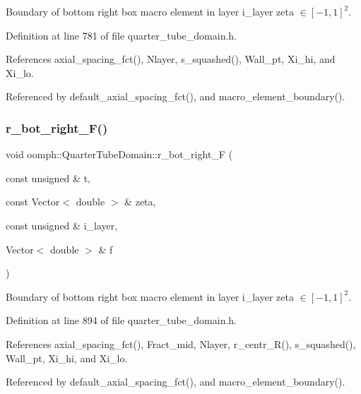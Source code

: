 Boundary of bottom right box macro element in layer i\+\_\+layer zeta $ \in [-1,1]^2 $. 



Definition at line 781 of file quarter\+\_\+tube\+\_\+domain.\+h.



References axial\+\_\+spacing\+\_\+fct(), Nlayer, s\+\_\+squashed(), Wall\+\_\+pt, Xi\+\_\+hi, and Xi\+\_\+lo.



Referenced by default\+\_\+axial\+\_\+spacing\+\_\+fct(), and macro\+\_\+element\+\_\+boundary().

\mbox{\label{classoomph_1_1QuarterTubeDomain_a7d71f1ff7b0ea3a9bdbf68b6248a60fe}} 
\subsubsection{\texorpdfstring{r\+\_\+bot\+\_\+right\+\_\+\+F()}{r\_bot\_right\_F()}}
{\footnotesize\ttfamily void oomph\+::\+Quarter\+Tube\+Domain\+::r\+\_\+bot\+\_\+right\+\_\+F (\begin{DoxyParamCaption}\item[{const unsigned \&}]{t,  }\item[{const Vector$<$ double $>$ \&}]{zeta,  }\item[{const unsigned \&}]{i\+\_\+layer,  }\item[{Vector$<$ double $>$ \&}]{f }\end{DoxyParamCaption})\hspace{0.3cm}{\ttfamily [private]}}



Boundary of bottom right box macro element in layer i\+\_\+layer zeta $ \in [-1,1]^2 $. 



Definition at line 894 of file quarter\+\_\+tube\+\_\+domain.\+h.



References axial\+\_\+spacing\+\_\+fct(), Fract\+\_\+mid, Nlayer, r\+\_\+centr\+\_\+\+R(), s\+\_\+squashed(), Wall\+\_\+pt, Xi\+\_\+hi, and Xi\+\_\+lo.



Referenced by default\+\_\+axial\+\_\+spacing\+\_\+fct(), and macro\+\_\+element\+\_\+boundary().

